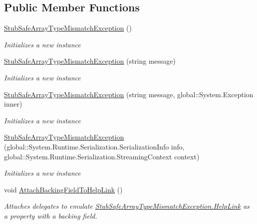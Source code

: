 \subsection*{Public Member Functions}
\begin{DoxyCompactItemize}
\item 
\hyperlink{class_system_1_1_runtime_1_1_interop_services_1_1_fakes_1_1_stub_safe_array_type_mismatch_exception_aef1ae55b1326a493648140b32a291e04}{Stub\-Safe\-Array\-Type\-Mismatch\-Exception} ()
\begin{DoxyCompactList}\small\item\em Initializes a new instance\end{DoxyCompactList}\item 
\hyperlink{class_system_1_1_runtime_1_1_interop_services_1_1_fakes_1_1_stub_safe_array_type_mismatch_exception_a7db66dff335c6e2fbee81f489b6bd7d8}{Stub\-Safe\-Array\-Type\-Mismatch\-Exception} (string message)
\begin{DoxyCompactList}\small\item\em Initializes a new instance\end{DoxyCompactList}\item 
\hyperlink{class_system_1_1_runtime_1_1_interop_services_1_1_fakes_1_1_stub_safe_array_type_mismatch_exception_adc20e9754acea007272a225c74a6149f}{Stub\-Safe\-Array\-Type\-Mismatch\-Exception} (string message, global\-::\-System.\-Exception inner)
\begin{DoxyCompactList}\small\item\em Initializes a new instance\end{DoxyCompactList}\item 
\hyperlink{class_system_1_1_runtime_1_1_interop_services_1_1_fakes_1_1_stub_safe_array_type_mismatch_exception_aa810e51d64a792006ed285cb1dc04502}{Stub\-Safe\-Array\-Type\-Mismatch\-Exception} (global\-::\-System.\-Runtime.\-Serialization.\-Serialization\-Info info, global\-::\-System.\-Runtime.\-Serialization.\-Streaming\-Context context)
\begin{DoxyCompactList}\small\item\em Initializes a new instance\end{DoxyCompactList}\item 
void \hyperlink{class_system_1_1_runtime_1_1_interop_services_1_1_fakes_1_1_stub_safe_array_type_mismatch_exception_a913c3d90dcabe7ff7854cb551bfcd599}{Attach\-Backing\-Field\-To\-Help\-Link} ()
\begin{DoxyCompactList}\small\item\em Attaches delegates to emulate \hyperlink{class_system_1_1_runtime_1_1_interop_services_1_1_fakes_1_1_stub_safe_array_type_mismatch_exception_a2bf31d30957e67de44df48bdc2e14a30}{Stub\-Safe\-Array\-Type\-Mismatch\-Exception.\-Help\-Link} as a property with a backing field.\end{DoxyCompactList}\item 

\end{DoxyCompactItemize}
